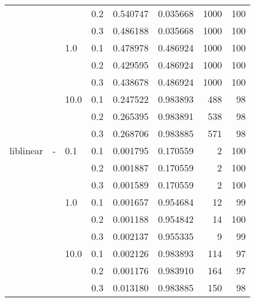 \begin{table}[H]
\begin{tabular}{llllrrrr}
          &   &      & 0.2 &  0.540747 &  0.035668 &    1000 &   100 \\
          &   &      & 0.3 &  0.486188 &  0.035668 &    1000 &   100 \\
          &   & 1.0  & 0.1 &  0.478978 &  0.486924 &    1000 &   100 \\
          &   &      & 0.2 &  0.429595 &  0.486924 &    1000 &   100 \\
          &   &      & 0.3 &  0.438678 &  0.486924 &    1000 &   100 \\
          &   & 10.0 & 0.1 &  0.247522 &  0.983893 &     488 &    98 \\
          &   &      & 0.2 &  0.265395 &  0.983891 &     538 &    98 \\
          &   &      & 0.3 &  0.268706 &  0.983885 &     571 &    98 \\
liblinear & - & 0.1  & 0.1 &  0.001795 &  0.170559 &       2 &   100 \\
          &   &      & 0.2 &  0.001887 &  0.170559 &       2 &   100 \\
          &   &      & 0.3 &  0.001589 &  0.170559 &       2 &   100 \\
          &   & 1.0  & 0.1 &  0.001657 &  0.954684 &      12 &    99 \\
          &   &      & 0.2 &  0.001188 &  0.954842 &      14 &   100 \\
          &   &      & 0.3 &  0.002137 &  0.955335 &       9 &    99 \\
          &   & 10.0 & 0.1 &  0.002126 &  0.983893 &     114 &    97 \\
          &   &      & 0.2 &  0.001176 &  0.983910 &     164 &    97 \\
          &   &      & 0.3 &  0.013180 &  0.983885 &     150 &    98 \\
\bottomrule
\end{tabular}
\end{table}
